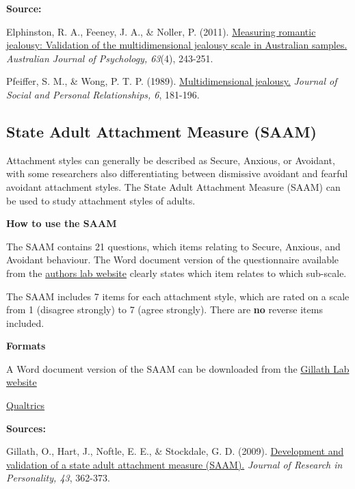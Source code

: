 \documentclass[
]{book}
\begin{document}
\textbf{Source:}

Elphinston, R. A., Feeney, J. A., \& Noller, P. (2011). \href{https://aps.onlinelibrary.wiley.com/doi/abs/10.1111/j.1742-9536.2011.00026.x}{Measuring romantic jealousy: Validation of the multidimensional jealousy scale in Australian samples.} \emph{Australian Journal of Psychology, 63}(4), 243-251.

Pfeiffer, S. M., \& Wong, P. T. P. (1989). \href{http://www.drpaulwong.com/wp-content/uploads/2018/03/Multidimensional-Jealousy-Scale-Pfeiffer-Wong-1989-Paper.pdf}{Multidimensional jealousy.} \emph{Journal of Social and Personal Relationships, 6}, 181-196.

\hypertarget{state-adult-attachment-measure-saam}{%
\subsection{State Adult Attachment Measure (SAAM)}\label{state-adult-attachment-measure-saam}}

Attachment styles can generally be described as Secure, Anxious, or Avoidant, with some researchers also differentiating between dismissive avoidant and fearful avoidant attachment styles. The State Adult Attachment Measure (SAAM) can be used to study attachment styles of adults.

\textbf{How to use the SAAM}

The SAAM contains 21 questions, which items relating to Secure, Anxious, and Avoidant behaviour. The Word document version of the questionnaire available from the \href{http://gillab.ku.edu/resources}{authors lab website} clearly states which item relates to which sub-scale.

The SAAM includes 7 items for each attachment style, which are rated on a scale from 1 (disagree strongly) to 7 (agree strongly). There are \textbf{no} reverse items included.

\textbf{Formats}

A Word document version of the SAAM can be downloaded from the \href{http://gillab.ku.edu/resources}{Gillath Lab website}

\href{link\%20to\%20file}{Qualtrics}

\textbf{Sources:}

Gillath, O., Hart, J., Noftle, E. E., \& Stockdale, G. D. (2009). \href{https://www.researchgate.net/profile/Omri_Gillath/publication/223185973_Development_and_validation_of_a_State_Adult_Attachment_Measure_SAAM/links/5a10d5c2458515cc5aa8073c/Development-and-validation-of-a-State-Adult-Attachment-Measure-SAAM.pdf}{Development and validation of a state adult attachment measure (SAAM).} \emph{Journal of Research in Personality, 43}, 362-373.
\end{document}
